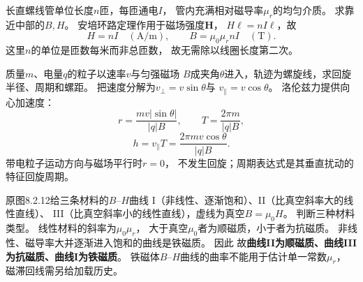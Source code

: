 \problemtext 长直螺线管单位长度$n$匝，每匝通电$I$，
管内充满相对磁导率$\mu_r$的均匀介质。
求靠近中部的$B,H$。
\workings
安培环路定理作用于磁场强度$\bm H$，
$H\ell=nI\ell$，故
\[
\boxed{H=nI\quad(\mathrm{A/m})},\qquad
\boxed{B=\mu_0\mu_r nI\quad(\mathrm T)}.
\]
\crosscheck 这里$n$的单位是匝数每米而非总匝数，
故无需除以线圈长度第二次。

\problemtext 质量$m$、电量$q$的粒子以速率$v$与匀强磁场
$B$成夹角$\theta$进入，轨迹为螺旋线，求回旋半径、周期和螺距。
\workings
把速度分解为$v_\perp=v\sin\theta$与
$v_\parallel=v\cos\theta$。
洛伦兹力提供向心加速度：
\[
\boxed{r=\frac{mv|\sin\theta|}{|q|B}},\qquad
\boxed{T=\frac{2\pi m}{|q|B}},
\]
\[
\boxed{h=v_\parallel T=
\frac{2\pi mv\cos\theta}{|q|B}}.
\]
\crosscheck 带电粒子运动方向与磁场平行时$r=0$，
不发生回旋；周期表达式是其垂直扰动的特征回旋周期。

\problemtext 原图8.2.12给三条材料的$B$--$H$曲线
I（非线性、逐渐饱和）、II（比真空斜率大的线性直线）、
III（比真空斜率小的线性直线），虚线为真空$B=\mu_0H$。
判断三种材料类型。
\workings
线性材料的斜率为$\mu_0\mu_r$，
大于真空$\mu_0$者为顺磁质，小于者为抗磁质。
非线性、磁导率大并逐渐进入饱和的曲线是铁磁质。
因此
故\textbf{曲线II为顺磁质、曲线III为抗磁质、曲线I为铁磁质}。
\crosscheck 铁磁体$B$--$H$曲线的曲率不能用于估计单一常数$\mu_r$，
磁滞回线需另给加载历史。
